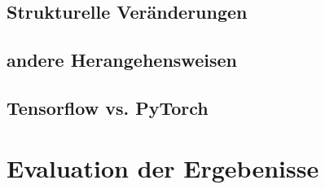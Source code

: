 \subsection{Strukturelle Veränderungen}


\subsection{andere Herangehensweisen}




\subsection{Tensorflow vs. PyTorch}



\section{Evaluation der Ergebenisse}
